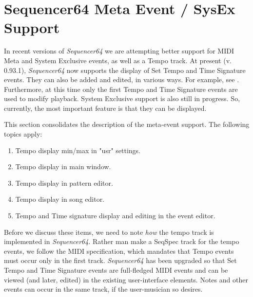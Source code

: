 %
%
%

\section{Sequencer64 Meta Event / SysEx Support}
\label{sec:meta_events}

   In recent versions of \textsl{Sequencer64} we are attempting better support
   for MIDI Meta and System Exclusive events, as well as a Tempo track.
   At present (v. 0.93.1), \textsl{Sequencer64} now supports the display of Set
   Tempo and Time Signature events.  They can also be added and edited, in various
   ways.  For example, see .
   Furthermore, at this time only the first Tempo and Time Signature events are
   used to modify playback.
   System Exclusive support is also still in progress.
   So, currently, the most important feature is that they can be displayed.

   This section consolidates the description of the meta-event support.
   The following topics apply:

   \begin{enumerate}
      \item Tempo display min/max in "usr" settings.
      \item Tempo display in main window.
      \item Tempo display in pattern editor.
      \item Tempo display in song editor.
      \item Tempo and Time signature display and editing in the event editor.
   \end{enumerate}

   Before we discuss these items, we need to note \textsl{how} the tempo track is
   implemented in \textsl{Sequencer64}.  Rather man make a SeqSpec track for
   the tempo events, we follow the MIDI specification, which mandates that
   Tempo events must occur only in the first track.  \textsl{Sequencer64} has
   been upgraded so that Set Tempo and Time Signature events are full-fledged
   MIDI events and can be viewed (and later, edited) in the existing
   user-interface elements.  Notes and other events can occur in the same
   track, if the user-musician so desires.

